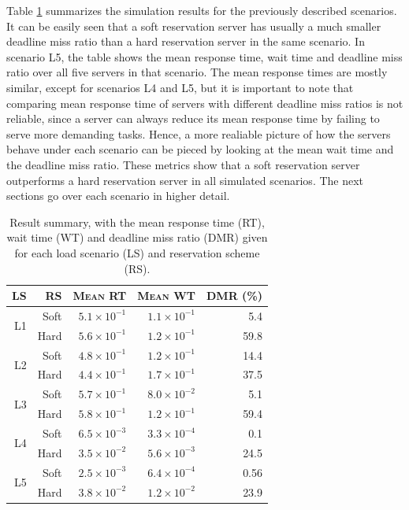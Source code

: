 \documentclass[times, 10pt,twocolumn]{article}
\begin{document}
\label{sec:indiv-simul-results}

Table \ref{tab:summary} summarizes the simulation results for the
previously described scenarios. It can be easily seen that a soft
reservation server has usually a much smaller deadline miss ratio than
a hard reservation server in the same scenario. In scenario L5, the
table shows the mean response time, wait time and deadline miss ratio
over all five servers in that scenario. The mean response times are
mostly similar, except for scenarios L4 and L5, but it is important to
note that comparing mean response time of servers with different
deadline miss ratios is not reliable, since a server can always reduce
its mean response time by failing to serve more demanding
tasks. Hence, a more realiable picture of how the servers behave under
each scenario can be pieced by looking at the mean wait time and the
deadline miss ratio. These metrics show that a soft reservation server
outperforms a hard reservation server in all simulated scenarios. The
next sections go over each scenario in higher detail.

\begin{table}[ht]
  \centering
  \begin{tabular}[t]{rrrrr} \hline
    \textsc{LS} & \textsc{RS} & \textsc{Mean RT} & \textsc{Mean WT} & \textsc{DMR (\%)} \\ \hline
    \multirow{2}{*}{L1} & Soft & $5.1\times 10^{-1}$   & $1.1\times 10^{-1}$   & 5.4  \\
                        & Hard & $5.6\times 10^{-1}$   & $1.2\times 10^{-1}$   & 59.8 \\ \hline
    \multirow{2}{*}{L2} & Soft & $4.8\times 10^{-1}$   & $1.2\times 10^{-1}$   & 14.4 \\
                        & Hard & $4.4\times 10^{-1}$   & $1.7\times 10^{-1}$   & 37.5 \\ \hline
    \multirow{2}{*}{L3} & Soft & $5.7\times 10^{-1}$   & $8.0\times 10^{-2}$   & 5.1  \\
                        & Hard & $5.8\times 10^{-1}$   & $1.2\times 10^{-1}$   & 59.4 \\ \hline
    \multirow{2}{*}{L4} & Soft & $6.5\times 10^{-3}$   & $3.3\times 10^{-4}$   & 0.1  \\
                        & Hard & $3.5\times 10^{-2}$   & $5.6\times 10^{-3}$   & 24.5 \\ \hline    
    \multirow{2}{*}{L5} & Soft & $2.5\times 10^{-3}$   & $6.4\times 10^{-4}$   & 0.56  \\
                        & Hard & $3.8\times 10^{-2}$   & $1.2\times 10^{-2}$   & 23.9 \\ \hline    
  \end{tabular}
  \caption{Result summary, with the mean response time (RT), wait time
  (WT) and deadline miss ratio (DMR) given for each load scenario (LS)
  and reservation scheme (RS).}
  \label{tab:summary}
\end{table}
\end{document}
